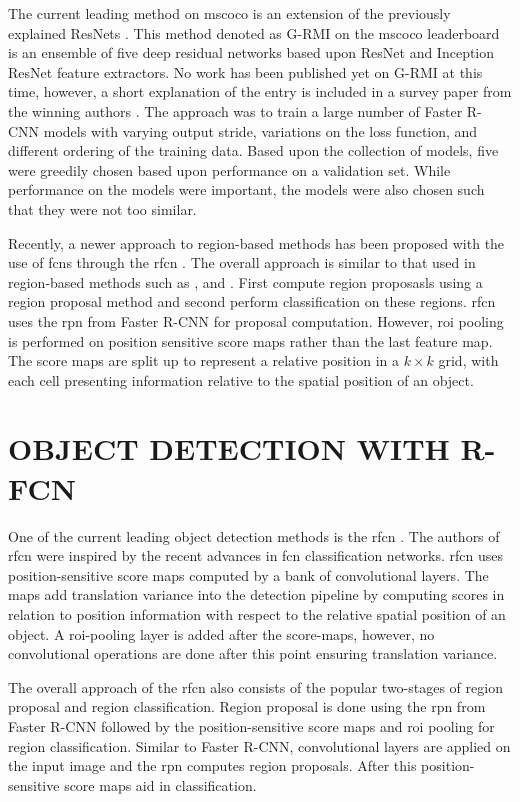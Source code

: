 \documentclass[a4paper,twoside]{article}
\begin{document}
The current leading method on \gls{mscoco} is an extension of the previously explained ResNets \cite{deepres}. This method denoted as G-RMI on the \gls{mscoco} leaderboard \cite{cocolead} is an ensemble of five deep residual networks based upon ResNet \cite{deepres} and Inception ResNet \cite{incepres} feature extractors. No work has been published yet on G-RMI at this time, however, a short explanation of the entry is included in a survey paper from the winning authors \cite{speedacc}. The approach was to train a large number of Faster R-CNN models with varying output stride, variations on the loss function, and different ordering of the training data. Based upon the collection of models, five were greedily chosen based upon performance on a validation set. While performance on the models were important, the models were also chosen such that they were not too similar. 

Recently, a newer approach to region-based methods has been proposed with the use of \glspl{fcn} through the \gls{rfcn} \cite{rfcn}. The overall approach is similar to that used in region-based methods such as \cite{rcnn}, \cite{fastrcnn} and \cite{fasterrcnn}. First compute region proposasls using a region proposal method and second perform classification on these regions. \gls{rfcn} uses the \gls{rpn} from Faster R-CNN \cite{fasterrcnn} for proposal computation. However, \gls{roi} pooling is performed on position sensitive score maps rather than the last feature map. The score maps are split up to represent a relative position in a $k\times k$ grid, with each cell presenting information relative to the spatial position of an object. 

\section{\uppercase{Object Detection with R-FCN}}
One of the current leading object detection methods is the \gls{rfcn} \cite{rfcn}. The authors of \gls{rfcn} were inspired by the recent advances in \gls{fcn} classification networks. \gls{rfcn} uses position-sensitive score maps computed by a bank of convolutional layers. The maps add translation variance into the detection pipeline by computing scores in relation to position information with respect to the relative spatial position of an object. A \gls{roi}-pooling layer is added after the score-maps, however, no convolutional operations are done after this point ensuring translation variance.

The overall approach of the \gls{rfcn} also consists of the popular two-stages of region proposal and region classification. Region proposal is done using the \gls{rpn} from Faster R-CNN followed by the position-sensitive score maps and \gls{roi} pooling for region classification. Similar to Faster R-CNN, convolutional layers are applied on the input image and the \gls{rpn} computes region proposals. After this position-sensitive score maps aid in classification.
\end{document}
